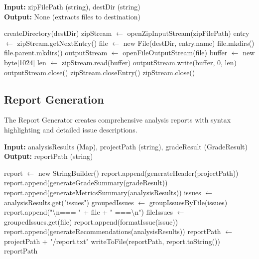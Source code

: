 \documentclass[12pt,a4paper]{article}
\begin{document}
    \begin{algorithm}[H]
        \caption{unzip}
        \textbf{Input:} zipFilePath (string), destDir (string)\\
        \textbf{Output:} None (extracts files to destination)
        \begin{algorithmic}[1]
            \State createDirectory(destDir)
            \State zipStream $\gets$ openZipInputStream(zipFilePath)
                \State entry $\gets$ zipStream.getNextEntry()
                \State file $\gets$ new File(destDir, entry.name)
                    \State file.mkdirs()
                \Else
                    \State file.parent.mkdirs()
                    \State outputStream $\gets$ openFileOutputStream(file)
                    \State buffer $\gets$ new byte[1024]
                        \State len $\gets$ zipStream.read(buffer)
                        \State outputStream.write(buffer, 0, len)
                    \EndWhile
                    \State outputStream.close()
                \EndIf
                \State zipStream.closeEntry()
            \EndWhile
            \State zipStream.close()
        \end{algorithmic}
    \end{algorithm}

    \subsection{Report Generation}

    The Report Generator creates comprehensive analysis reports with syntax highlighting and detailed issue descriptions.

    \begin{algorithm}[H]
        \caption{generateReport}
        \textbf{Input:} analysisResults (Map), projectPath (string), gradeResult (GradeResult)\\
        \textbf{Output:} reportPath (string)
        \begin{algorithmic}[1]
            \State report $\gets$ new StringBuilder()
            \State report.append(generateHeader(projectPath))
            \State report.append(generateGradeSummary(gradeResult))
            \State report.append(generateMetricsSummary(analysisResults))
            \State issues $\gets$ analysisResults.get("issues")
            \State groupedIssues $\gets$ groupIssuesByFile(issues)
                \State report.append("\textbackslash n=== " + file + " ===\textbackslash n")
                \State fileIssues $\gets$ groupedIssues.get(file)
                    \State report.append(formatIssue(issue))
                \EndFor
            \EndFor
            \State report.append(generateRecommendations(analysisResults))
            \State reportPath $\gets$ projectPath + "/report.txt"
            \State writeToFile(reportPath, report.toString())
            \Return reportPath
        \end{algorithmic}
    \end{algorithm}
\end{document}
